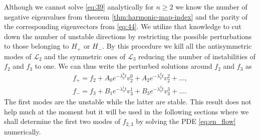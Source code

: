 Although we cannot solve \eqref{eq:39} analytically for $n\ge2$ we
know the number of negative eigenvalues from theorem
\ref{thm:harmonic-map-index} and the parity of the corresponding
eigenvectors from \eqref{eq:44}. We utilize that knowledge to cut down
the number of unstable directions by restricting the possible
perturbations to those belonging to $H_+$ or $H_-$. By this procedure
we kill all the antisymmetric modes of $\mathcal{L}_2$ and the
symmetric ones of $\mathcal{L}_3$ reducing the number of instabilities
of $f_2$ and $f_3$ to one. We can thus write the perturbed solutions
around $f_2$ and $f_3$ as
\begin{align}
  \label{eq:62}
  f_+=f_2+A_0e^{-\lambda_2^0t}v_2^0+A_2e^{-\lambda_2^2t}v_2^2+\dots,\\
  f_-=f_3+B_1e^{-\lambda_3^1t}v_3^1+B_3e^{-\lambda_3^3t}v_3^3+\dots.
\end{align}
The first modes are the unstable while the latter are stable. This
result does not help much at the moment but it will be used in the
following sections where we shall determine the first two modes of
$f_{2,3}$ by solving the PDE \eqref{eq:en_flow} numerically.


